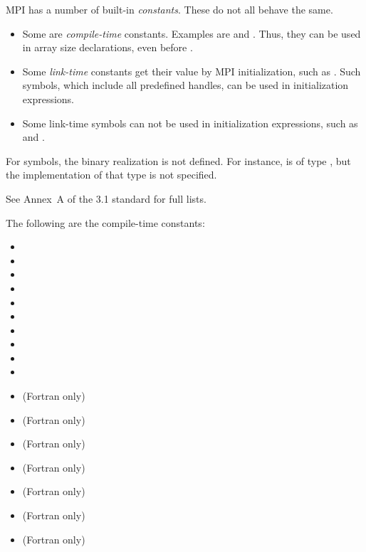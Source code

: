 MPI has a number of built-in \emph{constants}. These do not all behave
the same.
\begin{itemize}
\item Some are \emph{compile-time}
  constants. Examples are  and
  . Thus, they can be used in
  array size declarations, even before .
\item Some \emph{link-time}
  constants get their value by MPI initialization, such as
  . Such symbols, which include all
  predefined handles, can be used in initialization expressions.
\item Some link-time symbols can not be used in initialization
  expressions, such as  and .
\end{itemize}

For symbols, the binary realization is not defined. For instance,
 is of type , but
the implementation of that type is not specified.

See Annex~A of the 3.1 standard for full lists.

The following are the compile-time constants:
\begin{itemize}
\item {}
\item {}
\item {}
\item {}
\item {}
\item {}
\item {}
\item {}
\item {}
\item {}
\item {} (Fortran only)
\item {} (Fortran only)
\item {} (Fortran only)
\item {} (Fortran only)
\item {} (Fortran only)
\item {} (Fortran only)
\item {}  (Fortran only)
\end{itemize}

